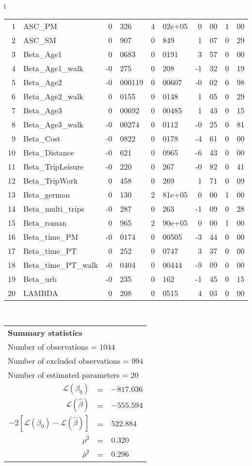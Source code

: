 \begin{tabular}{l}
\begin{tabular}{rlr@{.}lr@{.}lr@{.}lr@{.}l}
1 & ASC_PM  & 0&326 & 4&02e+05 & 0&00 & 1&00\\
2 & ASC_SM & 0&907 & 0&849 & 1&07 & 0&29\\
3 & Beta_Age1 & 0&0683 & 0&0191 & 3&57 & 0&00\\
4 & Beta_Age1_walk & -0&275 & 0&208 & -1&32 & 0&19\\
5 & Beta_Age2 & -0&000119 & 0&00607 & -0&02 & 0&98\\
6 & Beta_Age2_walk & 0&0155 & 0&0148 & 1&05 & 0&29\\
7 & Beta_Age3 & 0&00692 & 0&00485 & 1&43 & 0&15\\
8 & Beta_Age3_walk & -0&00274 & 0&0112 & -0&25 & 0&81\\
9 & Beta_Cost & -0&0822 & 0&0178 & -4&61 & 0&00\\
10 & Beta_Distance & -0&621 & 0&0965 & -6&43 & 0&00\\
11 & Beta_TripLeisure & -0&220 & 0&267 & -0&82 & 0&41\\
12 & Beta_TripWork & 0&458 & 0&269 & 1&71 & 0&09\\
13 & Beta_german & 0&130 & 2&81e+05 & 0&00 & 1&00\\
14 & Beta_multi_trips & -0&287 & 0&263 & -1&09 & 0&28\\
15 & Beta_roman & 0&965 & 2&90e+05 & 0&00 & 1&00\\
16 & Beta_time_PM & -0&0174 & 0&00505 & -3&44 & 0&00\\
17 & Beta_time_PT & 0&252 & 0&0747 & 3&37 & 0&00\\
18 & Beta_time_PT_walk & -0&0404 & 0&00444 & -9&09 & 0&00\\
19 & Beta_urb & -0&235 & 0&162 & -1&45 & 0&15\\
20 & LAMBDA & 0&208 & 0&0515 & 4&03 & 0&00\\
\hline
\end{tabular}
\\
\begin{tabular}{rcl}
\multicolumn{3}{l}{\bf Summary statistics}\\
\multicolumn{3}{l}{ Number of observations = $1044$} \\
\multicolumn{3}{l}{ Number of excluded observations = $994$} \\
\multicolumn{3}{l}{ Number of estimated  parameters = $20$} \\
 $\mathcal{L}(\beta_0)$ &=&  $-817.036$ \\
 $\mathcal{L}(\hat{\beta})$ &=& $-555.594 $  \\
 $-2[\mathcal{L}(\beta_0) -\mathcal{L}(\hat{\beta})]$ &=& $522.884$ \\
    $\rho^2$ &=&   $0.320$ \\
    $\bar{\rho}^2$ &=&    $0.296$ \\
\end{tabular}
  \end{tabular}
